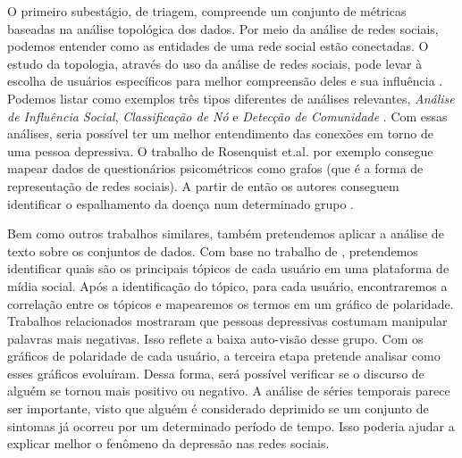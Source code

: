 \documentclass[11pt, notitlepage]{article} %
\begin{document}
O primeiro subestágio, de triagem, compreende um conjunto de métricas baseadas na análise topológica dos dados. Por meio da análise de redes sociais, podemos entender como as entidades de uma rede social estão conectadas. O estudo da topologia, através do uso da análise de redes sociais, pode levar à escolha de usuários específicos para melhor compreensão deles e sua influência \cite{Razis2020}. Podemos listar como exemplos três tipos diferentes de análises relevantes, \textit{Análise de Influência Social}, \textit{Classificação de Nó} e \textit{Detecção de Comunidade} \cite{aggarwal2011socialnetwork}. Com essas análises, seria possível ter um melhor entendimento das conexões em torno de uma pessoa depressiva. O trabalho de Rosenquist et.al. por exemplo consegue mapear dados de questionários psicométricos como grafos (que é a forma de representação de redes sociais). A partir de então os autores conseguem identificar o espalhamento da doença num determinado grupo \cite{Rosenquist2011}.


Bem como outros trabalhos similares, também pretendemos aplicar a análise de texto sobre os conjuntos de dados. Com base no trabalho de \cite{Nolasco2016}, pretendemos identificar quais são os principais tópicos de cada usuário em uma plataforma de mídia social. Após a identificação do tópico, para cada usuário, encontraremos a correlação entre os tópicos e mapearemos os termos em um gráfico de polaridade. 
Trabalhos relacionados mostraram que pessoas depressivas costumam manipular palavras mais negativas. Isso reflete a baixa auto-visão desse grupo. Com os gráficos de polaridade de cada usuário, a terceira etapa pretende analisar como esses gráficos evoluíram. Dessa forma, será possível verificar se o discurso de alguém se tornou mais positivo ou negativo. A análise de séries temporais parece ser importante, visto que alguém é considerado deprimido se um conjunto de sintomas já ocorreu por um determinado período de tempo. Isso poderia ajudar a explicar melhor o fenômeno da depressão nas redes sociais.
\end{document}
